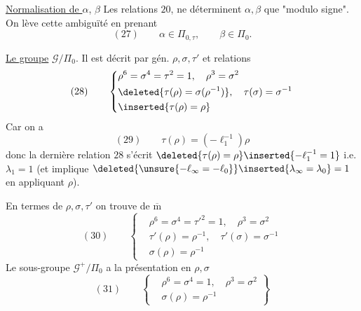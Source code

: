 \uline{Normalisation de $\alpha$}, $\beta$\quad
Les relations $20$, ne déterminent $\alpha,\beta$ que "modulo signe".
On lève cette ambiguïté en prenant
\[
(27)\qquad
\alpha\in\Pi_{0,\tau},\qquad\beta\in\Pi_0.
\]

\uline{Le groupe} $\mathcal G/\Pi_0$.
Il est décrit par gén. $\rho,\sigma,\tau'$ et relations 
\[
(28)\qquad
\left\{
\begin{aligned}
&\rho^6=\sigma^4=\tau^2=1,\quad \rho^3=\sigma^2\\
&\deleted{\tau(\rho)=\sigma(\rho^{-1})},\quad \tau(\sigma)=\sigma^{-1}\\
&\inserted{\tau(\rho)=\rho}
\end{aligned}
\right.
\]
Car on a
\[
(29)\qquad
\tau(\rho)=(-\ell_1^{-1})\rho
\]
donc la dernière relation $28$ s'écrit
$\deleted{\tau(\rho)=\rho}\inserted{-\ell_1^{-1}=1}$
i.e. $\lambda_1=1$
(et implique
$\deleted{\unsure{-\ell_\infty=-\ell_0}}\inserted{\lambda_\infty=\lambda_0}=1$
en appliquant $\rho$).




En termes de $\rho,\sigma,\tau'$ on trouve de $\overline{\mathrm m}$
\[
(30)\qquad
\left\{
\begin{aligned}
&\rho^6=\sigma^4=\tau'^2=1,\quad \rho^3=\sigma^2\\
&\tau'(\rho)=\rho^{-1},\quad\tau'(\sigma)=\sigma^{-1}\\
&\sigma(\rho)=\rho^{-1}
\end{aligned}
\right.
\]
Le sous-groupe $\mathcal G^+/\Pi_0$ a la présentation en $\rho,\sigma$
\[
(31)\qquad
\left\{
\begin{aligned}
&\rho^6=\sigma^4=1,\quad \rho^3=\sigma^2\\
&\sigma(\rho)=\rho^{-1}
\end{aligned}
\right\}
\]

